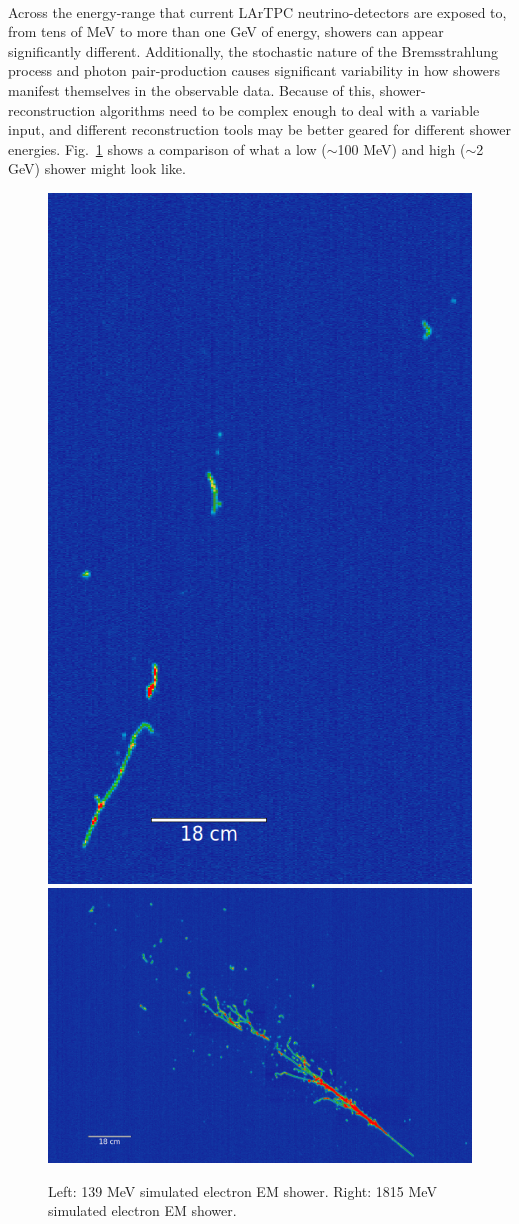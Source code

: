 \paragraph{}Across the energy-range that current LArTPC neutrino-detectors are exposed to, from tens of MeV to more than one GeV of energy, showers can appear significantly different. Additionally, the stochastic nature of the Bremsstrahlung process and photon pair-production causes significant variability in how showers manifest themselves in the observable data. Because of this, shower-reconstruction algorithms need to be complex enough to deal with a variable input, and different reconstruction tools may be better geared for different shower energies. Fig.~\ref{fig:emshower_sim} shows a comparison of what a low ($\sim$100 MeV) and high ($\sim$2 GeV) shower might look like.
\begin{figure}[H]
\centering
\includegraphics[height=0.45\textwidth]{figures/raw_sim_eminus_139MeV.png}
\includegraphics[height=0.45\textwidth]{figures/raw_sim_eminus_1815MeV.png}
\caption{Left: 139 MeV simulated electron EM shower. Right: 1815 MeV simulated electron EM shower.}
\label{fig:emshower_sim}
\end{figure}
